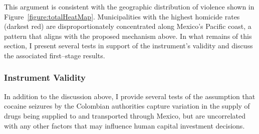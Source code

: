 \documentclass[12pt,letter,english,intoc,bibliography=totoc,index=totoc,BCOR10mm,captions=tableheading,nottitlepage,fleqn]{article}
\theoremstyle{break}
\begin{document}
This argument is consistent with the geographic distribution of violence shown in Figure~\ref{figure:totalHeatMap}. Municipalities with the highest homicide rates (darkest red) are disproportionately concentrated along Mexico's Pacific coast, a pattern that aligns with the proposed mechanism above. In what remains of this section, I present several tests in support of the instrument's validity and discuss the associated first--stage results. 


\subsubsection*{Instrument Validity}
In addition to the discussion above, I provide several tests of the assumption that cocaine seizures by the Colombian authorities capture variation in the supply of drugs being supplied to and transported through Mexico, but are uncorrelated with any other factors that may influence human capital investment decisions. 
\end{document}
